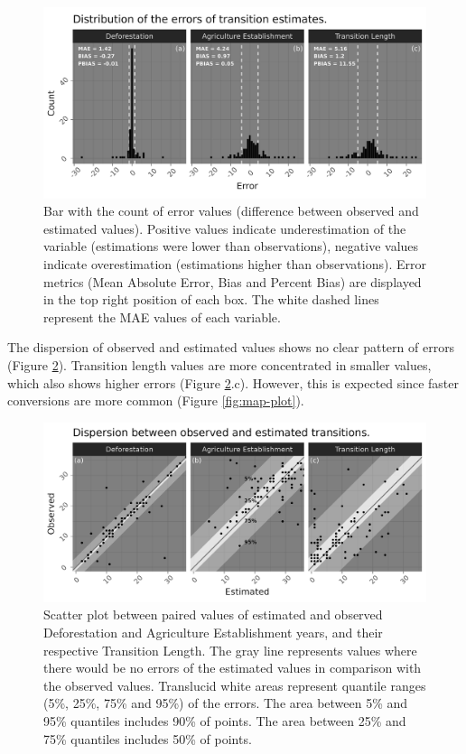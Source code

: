 \documentclass[essd, manuscript]{copernicus}
\begin{document}
\begin{figure}[h]
\includegraphics[width=17cm]{figs/error_bars} \caption{Bar with the count of error values (difference between observed and estimated values). Positive values indicate underestimation of the variable (estimations were lower than observations), negative values indicate overestimation (estimations higher than observations). Error metrics (Mean Absolute Error, Bias and Percent Bias) are displayed in the top right position of each box. The white dashed lines represent the MAE values of each variable.}\label{fig:errorbar-plot}
\end{figure}

The dispersion of observed and estimated values shows no clear pattern of errors (Figure \ref{fig:errorscatter-plot}).
Transition length values are more concentrated in smaller values, which also shows higher errors (Figure \ref{fig:errorscatter-plot}.c).
However, this is expected since faster conversions are more common (Figure \ref{fig:map-plot}).

\begin{figure}[h]
\includegraphics[width=17cm]{figs/error_scatter} \caption{Scatter plot between paired values of estimated and observed Deforestation and Agriculture Establishment years, and their respective Transition Length. The gray line represents values where there would be no errors of the estimated values in comparison with the observed values. Translucid white areas represent quantile ranges (5\%, 25\%, 75\% and 95\%) of the errors. The area between 5\% and 95\% quantiles includes 90\% of points. The area between 25\% and 75\% quantiles includes 50\% of points.}\label{fig:errorscatter-plot}
\end{figure}
\end{document}
